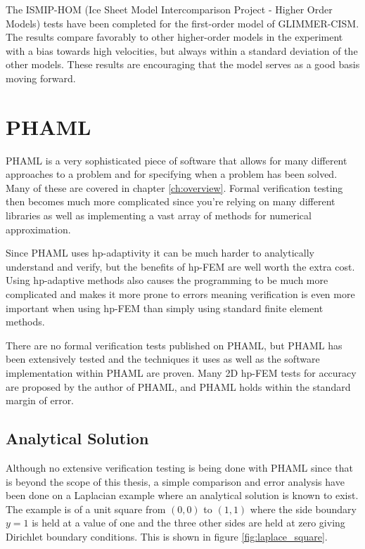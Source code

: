 The ISMIP-HOM (Ice Sheet Model Intercomparison Project - Higher Order Models) tests have been completed for the first-order model of GLIMMER-CISM.  The results compare favorably to other higher-order models in the experiment with a bias towards high velocities, but always within a standard deviation of the other models.\citep{Bocek:2009}  These results are encouraging that the model serves as a good basis moving forward.



\section{PHAML}\label{sec:chp5phaml}

PHAML is a very sophisticated piece of software that allows for many different approaches to a problem and for specifying when a problem has been solved.  Many of these are covered in chapter \ref{ch:overview}.  Formal verification testing then becomes much more complicated since you're relying on many different libraries as well as implementing a vast array of methods for numerical approximation.

Since PHAML uses hp-adaptivity it can be much harder to analytically understand and verify, but the benefits of hp-FEM are well worth the extra cost.  Using hp-adaptive methods also causes the programming to be much more complicated and makes it more prone to errors meaning verification is even more important when using hp-FEM than simply using standard finite element methods.
\citep{Demkowicz:2007}

There are no formal verification tests published on PHAML, but PHAML has been extensively tested and the techniques it uses as well as the software implementation within PHAML are proven.  Many 2D hp-FEM tests for accuracy are proposed by the author of PHAML, and PHAML holds within the standard margin of error. \citet{mitchell:2d}

\subsection{Analytical Solution}

Although no extensive verification testing is being done with PHAML since that is beyond the scope of this thesis, a simple comparison and error analysis have been done on a Laplacian example where an analytical solution is known to exist.  The example is of a unit square from $(0,0)$ to $(1,1)$ where the side boundary $y=1$ is held at a value of one and the three other sides are held at zero giving Dirichlet boundary conditions.  This is shown in figure \ref{fig:laplace_square}.

